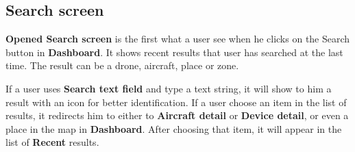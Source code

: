 \subsection{Search screen}\label{subsec:search-screen}
\textbf{Opened Search screen} is the first what a user see when he clicks on the Search button in \textbf{Dashboard}.
It shows recent results that user has searched at the last time.
The result can be a drone, aircraft, place or zone.

If a user uses \textbf{Search text field} and type a text string, it will show to him a result with an icon for better identification.
If a user choose an item in the list of results, it redirects him to either to \textbf{Aircraft detail} or \textbf{Device detail}, or even a place in the map in \textbf{Dashboard}.
After choosing that item, it will appear in the list of \textbf{Recent} results.

